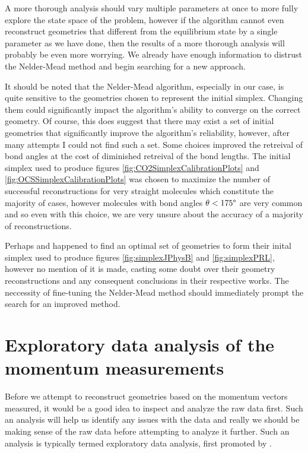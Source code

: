 A more thorough analysis should vary multiple parameters at once to more fully explore the state space of the problem, however if the algorithm cannot even reconstruct geometries that different from the equilibrium state by a single parameter as we have done, then the results of a more thorough analysis will probably be even more worrying. We already have enough information to distrust the Nelder-Mead method and begin searching for a new approach.

It should be noted that the Nelder-Mead algorithm, especially in our case, is quite sensitive to the geometries chosen to represent the initial simplex. Changing them could significantly impact the algorithm's ability to converge on the correct geometry. Of course, this does suggest that there may exist a set of initial geometries that significantly improve the algorithm's reliability, however, after many attempts I could not find such a set. Some choices improved the retreival of bond angles at the cost of diminished retreival of the bond lengths. The initial simplex used to produce figures \ref{fig:CO2SimplexCalibrationPlots} and \ref{fig:OCSSimplexCalibrationPlots} was chosen to maximize the number of successful reconstructions for very straight molecules which constitute the majority of cases, however molecules with bond angles $\theta < 175\degree$ are very common and so even with this choice, we are very unsure about the accuracy of a majority of reconstructions.


Perhaps \citet{Brichta07} and \citet{Bocharova11} happened to find an optimal set of geometries to form their inital simplex used to produce figures \ref{fig:simplexJPhysB} and \ref{fig:simplexPRL}, however no mention of it is made, casting some doubt over their geometry reconstructions and any consequent conclusions in their respective works. The neccessity of fine-tuning the Nelder-Mead method should immediately prompt the search for an improved method.

\section{Exploratory data analysis of the momentum measurements}
Before we attempt to reconstruct geometries based on the momentum vectors measured, it would be a good idea to inspect and analyze the raw data first. Such an analysis will help us identify any issues with the data and really we should be making sense of the raw data before attempting to analyze it further. Such an analysis is typically termed exploratory data analysis, first promoted by \citet{Tukey77}.

